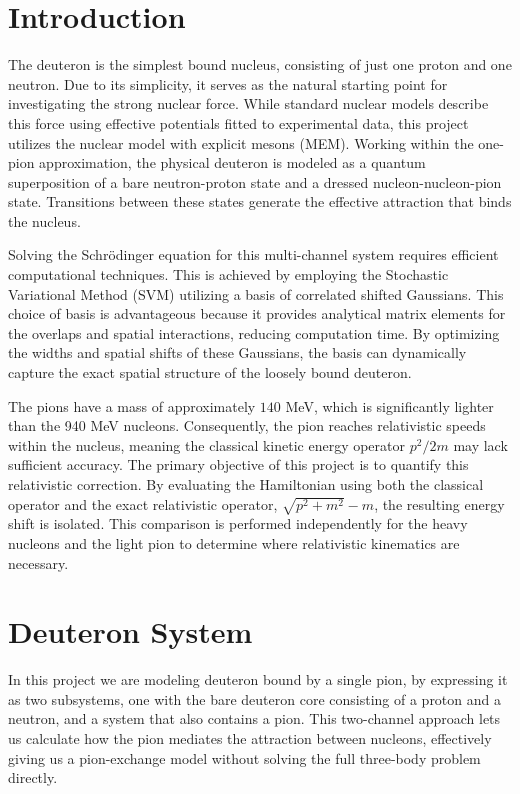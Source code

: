 \documentclass[a4paper,oneside,article,12pt]{memoir}
\begin{document}
\newpage
\pagestyle{empty}
\setcounter{tocdepth}{2}
\setcounter{secnumdepth}{1}
\hypersetup{linkcolor=black} %
\tableofcontents* %
\pagestyle{empty}
\hypersetup{linkcolor=red} %

\newpage
\pagestyle{plain}
\setcounter{page}{1}
\chapter{Introduction}
The deuteron is the simplest bound nucleus, consisting of just one proton and one neutron. Due to its simplicity, it serves as the natural starting point for investigating the strong nuclear force. While standard nuclear models describe this force using effective potentials fitted to experimental data, this project utilizes the nuclear model with explicit mesons (MEM). Working within the one-pion approximation, the physical deuteron is modeled as a quantum superposition of a bare neutron-proton state and a dressed nucleon-nucleon-pion state. Transitions between these states generate the effective attraction that binds the nucleus.

Solving the Schrödinger equation for this multi-channel system requires efficient computational techniques. 
This is achieved by employing the Stochastic Variational Method (SVM) utilizing a basis of correlated shifted Gaussians. This choice of basis is advantageous because it provides analytical matrix elements for the overlaps and spatial interactions, reducing computation time. 
By optimizing the widths and spatial shifts of these Gaussians, the basis can dynamically capture the exact spatial structure of the loosely bound deuteron.

The pions have a mass of approximately $140$ MeV, which is significantly lighter than the 940 MeV nucleons. Consequently, the pion reaches relativistic speeds within the nucleus, meaning the classical kinetic energy operator $p^2/2m$ may lack sufficient accuracy. The primary objective of this project is to quantify this relativistic correction. By evaluating the Hamiltonian using both the classical operator and the exact relativistic operator, $\sqrt{p^2+m^2}-m$, the resulting energy shift is isolated. This comparison is performed independently for the heavy nucleons and the light pion to determine where relativistic kinematics are necessary.

\newpage
\chapter{Deuteron System} \label{ch:deuteron}
In this project we are modeling deuteron bound by a single pion, by expressing it as two subsystems, one with the bare deuteron core consisting of a proton and a neutron, and a system that also contains a pion. This two-channel approach lets us calculate how the pion mediates the attraction between nucleons, effectively giving us a pion-exchange model without solving the full three-body problem directly. 
\end{document}
